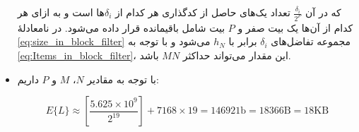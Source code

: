 \begin{itemize}
{که در آن 
$\frac{\delta_i}{2^P}$
تعداد یک‌های حاصل از کدگذاری هر کدام از 
$\delta_i$ها
است و به ازای هر کدام از آن‌ها یک بیت صفر و $P$ بیت شامل باقیمانده قرار داده می‌شود. در نامعادلهٔ \eqref{eq:size_in_block_filter} مجموعه تفاضل‌های $ \delta_i $ برابر با $h_N$ می‌شود و با توجه به \eqref{eq:Items_in_block_filter}، این مقدار می‌تواند حداکثر $MN$ باشد.

}
%
%
%
%
%
% 
%
%
%

\item{%
با توجه به مقادیر $N$، $M$ و $P$ داریم:

\begin{equation}
\label{E_L_3_block_filter}
E\{L\} \approx \left[\frac{5.625 \times 10^{9}}{2^{19}}\right] + 7168 \times 19 = 146921\text{b} = 18366\text{B} = 18\text{KB}
\end{equation}


}
 \end{itemize}

